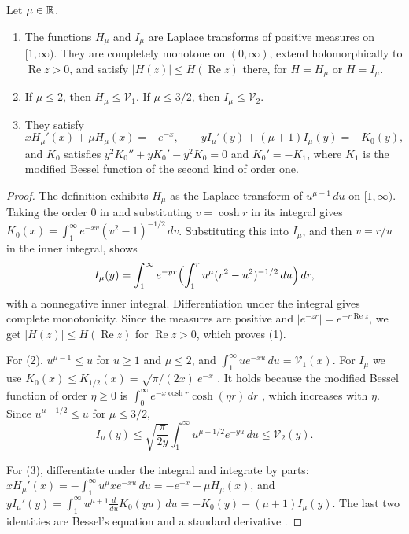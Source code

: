 \begin{lemma}\label{an:kernels}
Let $\mu\in\mathbb R$.
\begin{enumerate}
\item The functions $H_\mu$ and $I_\mu$ are Laplace transforms of positive
 measures on $[1,\infty)$. They are completely monotone on $(0,\infty)$,
 extend holomorphically to $\operatorname{Re}z>0$, and satisfy
 $|H(z)|\le H(\operatorname{Re}z)$ there, for $H=H_\mu$ or $H=I_\mu$.
\item If $\mu\le2$, then $H_\mu\le\mathcal V_1$. If $\mu\le3/2$, then
 $I_\mu\le\mathcal V_2$.
\item They satisfy
 \[
 xH_\mu'(x)+\mu H_\mu(x)=-e^{-x},\qquad
 yI_\mu'(y)+(\mu+1)I_\mu(y)=-K_0(y),
 \]
 and $K_0$ satisfies $y^2K_0''+yK_0'-y^2K_0=0$ and $K_0'=-K_1$, where
 $K_1$ is the modified Bessel function of the second kind of order one.
\end{enumerate}
\end{lemma}

\begin{proof}
The definition exhibits $H_\mu$ as the Laplace transform of
$u^{\mu-1}\,du$ on $[1,\infty)$. Taking the order $0$ in
\cite[10.32.9]{DLMF} and substituting $v=\cosh r$ in its integral gives
$K_0(x)=\int_1^\infty e^{-xv}(v^2-1)^{-1/2}\,dv$. Substituting this into
$I_\mu$, and then $v=r/u$ in the inner integral, shows
\[
 I_\mu(y)=\int_1^\infty e^{-yr}\Bigl(\int_1^ru^\mu(r^2-u^2)^{-1/2}\,du\Bigr)
 \,dr,
\]
with a nonnegative inner integral. Differentiation under the integral
gives complete monotonicity. Since the measures are positive and
$|e^{-zr}|=e^{-r\operatorname{Re}z}$, we get $|H(z)|\le H(\operatorname{Re}z)$
for $\operatorname{Re}z>0$, which proves (1).

For (2), $u^{\mu-1}\le u$ for $u\ge1$ and $\mu\le2$, and
$\int_1^\infty ue^{-xu}\,du=\mathcal V_1(x)$. For $I_\mu$ we use
$K_0(x)\le K_{1/2}(x)=\sqrt{\pi/(2x)}\,e^{-x}$ \cite[10.39.2]{DLMF}. It
holds because the modified Bessel function of order $\eta\ge0$ is
$\int_0^\infty e^{-x\cosh r}\cosh(\eta r)\,dr$ \cite[10.32.9]{DLMF}, which
increases with $\eta$. Since $u^{\mu-1/2}\le u$ for $\mu\le3/2$,
\[
 I_\mu(y)\le\sqrt{\frac\pi{2y}}\int_1^\infty u^{\mu-1/2}e^{-yu}\,du
 \le\mathcal V_2(y).
\]

For (3), differentiate under the integral and integrate by parts:
$xH_\mu'(x)=-\int_1^\infty u^\mu xe^{-xu}\,du=-e^{-x}-\mu H_\mu(x)$, and
$yI_\mu'(y)=\int_1^\infty u^{\mu+1}\frac{d}{du}K_0(yu)\,du
=-K_0(y)-(\mu+1)I_\mu(y)$. The last two identities are Bessel's equation
and a standard derivative \cite[10.25.1, 10.29.3]{DLMF}.
\end{proof}

